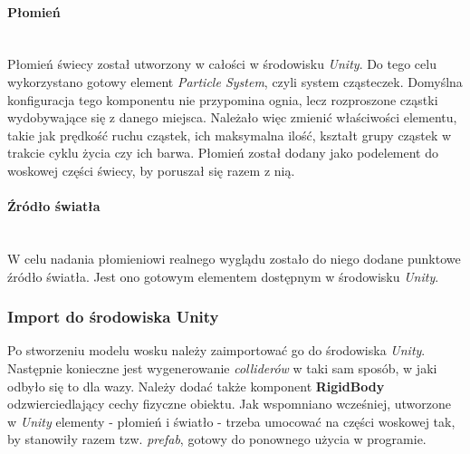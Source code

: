 \paragraph{Płomień}
\mbox{}\\
Płomień świecy został utworzony w całości w środowisku \textit{Unity}. Do tego celu wykorzystano gotowy element \textit{Particle System}, czyli system cząsteczek. Domyślna konfiguracja tego komponentu nie przypomina ognia, lecz rozproszone cząstki wydobywające się z danego miejsca. Należało więc zmienić właściwości elementu, takie jak prędkość ruchu cząstek, ich maksymalna ilość, kształt grupy cząstek w trakcie cyklu życia czy ich barwa. Płomień został dodany jako podelement do woskowej części świecy, by poruszał się razem z nią.

\paragraph{Źródło światła}
\mbox{}\\
W celu nadania płomieniowi realnego wyglądu zostało do niego dodane punktowe źródło światła. Jest ono gotowym elementem dostępnym w środowisku \textit{Unity}.

\subsubsection{Import do środowiska Unity}
Po stworzeniu modelu wosku należy zaimportować go do środowiska \textit{Unity}. Następnie konieczne jest wygenerowanie \textit{colliderów} w taki sam sposób, w jaki odbyło się to dla wazy. Należy dodać także komponent \textbf{RigidBody} odzwierciedlający cechy fizyczne obiektu. Jak wspomniano wcześniej, utworzone w \textit{Unity} elementy - płomień i światło - trzeba umocować na części woskowej tak, by stanowiły razem tzw. \textit{prefab}, gotowy do ponownego użycia w programie.

